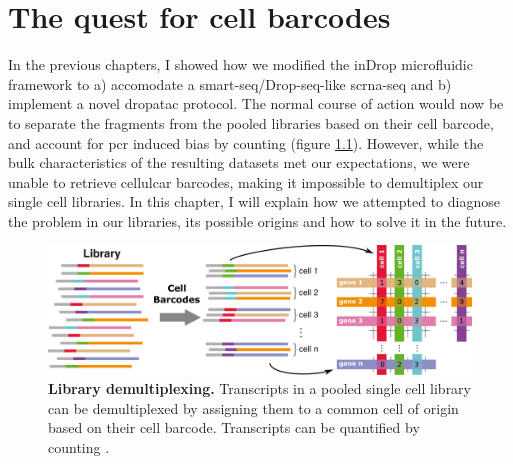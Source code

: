 \chapter{The quest for cell barcodes}
\label{ch:seq}
In the previous chapters, I showed how we modified the inDrop microfluidic framework to a) accomodate a \acrshort{smart-seq}/Drop-seq-like \acrshort{scrna-seq} and b) implement a novel \acrshort{dropatac} protocol. The normal course of action would now be to separate the fragments from the pooled libraries based on their cell barcode, and account for \acrshort{pcr} induced bias by counting  (figure \ref{fig:seq_cellmatrix}). However, while the bulk characteristics of the resulting datasets met our expectations, we were unable to retrieve cellulcar barcodes, making it impossible to demultiplex our single cell libraries. In this chapter, I will explain how we attempted to diagnose the problem in our libraries, its possible origins and how to solve it in the future.\pms


\begin{figure}[ht]
\centerfloat
\includegraphics[width=\textwidth]{./ims/seq_cellmatrix.png}
\caption[Library demultiplexing]{\textbf{Library demultiplexing.} Transcripts in a pooled single cell library can be demultiplexed by assigning them to a common cell of origin based on their cell barcode. Transcripts can be quantified by counting .}
\label{fig:seq_cellmatrix}
\end{figure}

